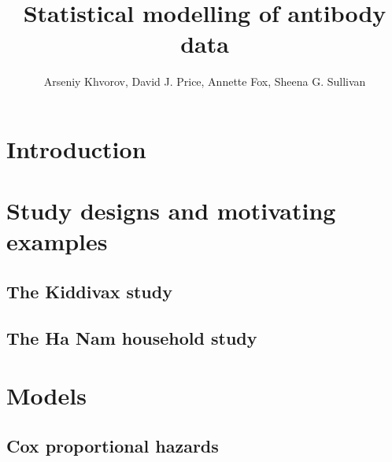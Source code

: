 \documentclass[12pt]{article}
\title{Statistical modelling of antibody data}
\author{Arseniy Khvorov, David J. Price, Annette Fox, Sheena G. Sullivan}
\begin{document}
\maketitle


\section{Introduction}



\section{Study designs and motivating examples}



\subsection{The Kiddivax study}



\subsection{The Ha Nam household study}





\section{Models}



\subsection{Cox proportional hazards}


\end{document}
